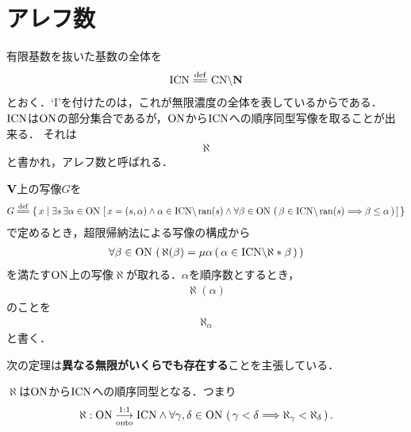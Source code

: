 \section{アレフ数}
	有限基数を抜いた基数の全体を
	\begin{align}
		\InfCN \defeq \CN \backslash \Natural
	\end{align}
	とおく．`I'を付けたのは，これが無限濃度の全体を表しているからである．
	$\mathrm{ICN}$は$\mathrm{ON}$の部分集合であるが，$\mathrm{ON}$から$\mathrm{ICN}$への順序同型写像を取ることが出来る．
	それは
	\begin{align}
		\aleph
	\end{align}
	と書かれ，アレフ数と呼ばれる．　
	
	\begin{screen}
		\begin{dfn}
			$\mathbf{V}$上の写像$G$を
			\begin{align}
				G \defeq \Set{x}{\exists s\, \exists \alpha \in \ON\, 
				\left[\, x=(s,\alpha) \wedge \alpha \in \InfCN \backslash \ran{s} \wedge
				\forall \beta \in \ON\, \left(\, \beta \in \InfCN \backslash \ran{s}
				\Longrightarrow \beta \leq \alpha\, \right)\, \right]}
			\end{align}
			で定めるとき，超限帰納法による写像の構成から
			\begin{align}
				\forall \beta \in \mathrm{ON}\, 
				\left(\, \aleph(\beta) = \mu \alpha\, (\, \alpha \in \mathrm{ICN} \backslash \aleph \ast \beta\, )\, \right)
			\end{align}
			を満たす$\mathrm{ON}$上の写像$\aleph$が取れる．$\alpha$を順序数とするとき，
			\begin{align}
				\aleph(\alpha)
			\end{align}
			のことを
			\begin{align}
				\aleph_\alpha
			\end{align}
			と書く．
		\end{dfn}
	\end{screen}
	
	次の定理は{\bf 異なる無限がいくらでも存在する}ことを主張している．
	
	\begin{screen}
		\begin{thm}
			$\aleph$は$\mathrm{ON}$から$\mathrm{ICN}$への順序同型となる．つまり
			\begin{align}
				\aleph:\mathrm{ON} \underset{\mathrm{onto}}{\overset{\mathrm{1:1}}{\longrightarrow}} \mathrm{ICN} \wedge \forall \gamma, \delta \in \mathrm{ON}\, \left(\, \gamma < \delta
				\Longrightarrow \aleph_\gamma < \aleph_\delta\, \right).
			\end{align}
		\end{thm}
	\end{screen}
	
